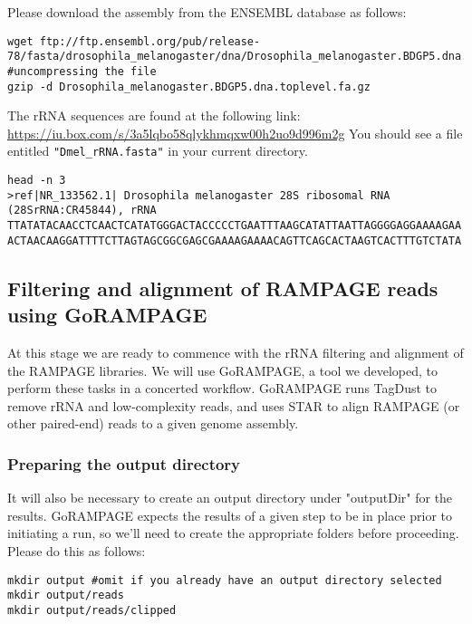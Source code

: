\documentclass[runningheads,a4paper]{llncs}
\begin{document}
\begin{linenumbers}
\begin{itemize}
Please download the assembly from the ENSEMBL database as follows:

\noindent
\begin{verbatim}
wget ftp://ftp.ensembl.org/pub/release-78/fasta/drosophila_melanogaster/dna/Drosophila_melanogaster.BDGP5.dna.toplevel.fa.gz
#uncompressing the file
gzip -d Drosophila_melanogaster.BDGP5.dna.toplevel.fa.gz
\end{verbatim}

The rRNA sequences are found at the following link:
\url{https://iu.box.com/s/3a5lqbo58qlykhmqxw00h2uo9d996m2g}
You should see a file entitled \texttt{"Dmel\_rRNA.fasta"} in your current directory.

\noindent
\begin{verbatim}
head -n 3
>ref|NR_133562.1| Drosophila melanogaster 28S ribosomal RNA (28SrRNA:CR45844), rRNA
TTATATACAACCTCAACTCATATGGGACTACCCCCTGAATTTAAGCATATTAATTAGGGGAGGAAAAGAA
ACTAACAAGGATTTTCTTAGTAGCGGCGAGCGAAAAGAAAACAGTTCAGCACTAAGTCACTTTGTCTATA
\end{verbatim}

\subsection{Filtering and alignment of RAMPAGE reads using GoRAMPAGE}

At this stage we are ready to commence with the rRNA filtering and alignment of the RAMPAGE libraries.
We will use GoRAMPAGE, a tool we developed, to perform these tasks in a concerted workflow. 
GoRAMPAGE runs TagDust \cite{Lassmann:2015gs} to remove rRNA and low-complexity reads, and uses STAR \cite{Dobin:2016kq} to align RAMPAGE (or other paired-end) reads to a given genome assembly.\\

\subsubsection{Preparing the output directory}

It will also be necessary to create an output directory under "outputDir" for the results.
GoRAMPAGE expects the results of a given step to be in place prior to initiating a run, so we'll need to create the appropriate folders before proceeding.
Please do this as follows:

\noindent
\begin{verbatim}
mkdir output #omit if you already have an output directory selected
mkdir output/reads
mkdir output/reads/clipped
\end{verbatim}


\end{itemize}
\end{linenumbers}
\end{document}
